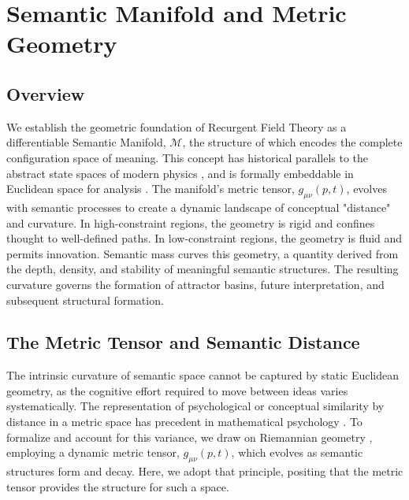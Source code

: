 \chapter{Semantic Manifold and Metric Geometry}
\label{3:semantic_manifold_and_metric_geometry}


\section{Overview}
\label{3.1:overview}

We establish the geometric foundation of Recurgent Field Theory as a differentiable Semantic Manifold, \(\mathcal{M}\), the structure of which encodes the complete configuration space of meaning. This concept has historical parallels to the abstract state spaces of modern physics \autocite{vonNeumann1932}, and is formally embeddable in Euclidean space for analysis \autocite{Whitney1936}. The manifold's metric tensor, \(g_{\mu\nu}(p, t)\), evolves with semantic processes to create a dynamic landscape of conceptual "distance" and curvature. In high-constraint regions, the geometry is rigid and confines thought to well-defined paths. In low-constraint regions, the geometry is fluid and permits innovation. Semantic mass curves this geometry, a quantity derived from the depth, density, and stability of meaningful semantic structures. The resulting curvature governs the formation of attractor basins, future interpretation, and subsequent structural formation.


\section{The Metric Tensor and Semantic Distance}
\label{3.2:the_metric_tensor_and_semantic_distance}

The intrinsic curvature of semantic space cannot be captured by static Euclidean geometry, as the cognitive effort required to move between ideas varies systematically. The representation of psychological or conceptual similarity by distance in a metric space has precedent in mathematical psychology \autocite{Shepard1987}. To formalize and account for this variance, we draw on Riemannian geometry \autocite{Riemann1868, doCarmo1992}, employing a dynamic metric tensor, \(g_{\mu\nu}(p,t)\), which evolves as semantic structures form and decay. Here, we adopt that principle, positing that the metric tensor provides the structure for such a space.

